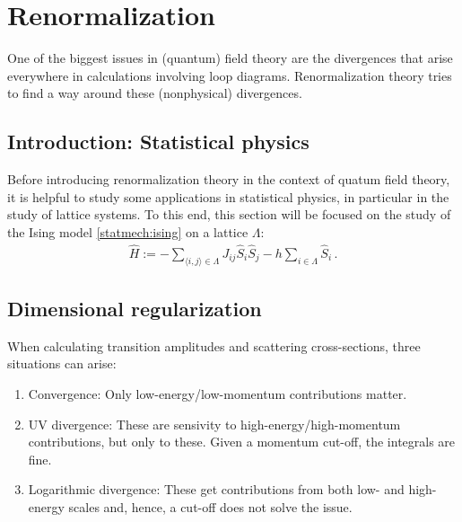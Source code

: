 \section{Renormalization}

    One of the biggest issues in (quantum) field theory are the divergences that arise everywhere in calculations involving loop diagrams. Renormalization theory tries to find a way around these (nonphysical) divergences.

\subsection{Introduction: Statistical physics}

    Before introducing renormalization theory in the context of quatum field theory, it is helpful to study some applications in statistical physics, in particular in the study of lattice systems. To this end, this section will be focused on the study of the Ising model \ref{statmech:ising} on a lattice $\Lambda$:
    \begin{gather}
        \widehat{H} := -\sum_{\langle i,j \rangle\in\Lambda}J_{ij}\widehat{S}_i\widehat{S}_j-h\sum_{i\in\Lambda}\widehat{S}_i\,.
    \end{gather}

\subsection{Dimensional regularization}

    When calculating transition amplitudes and scattering cross-sections, three situations can arise:
    \begin{enumerate}
        \item Convergence: Only low-energy/low-momentum contributions matter.
        \item UV divergence: These are sensivity to high-energy/high-momentum contributions, but only to these. Given a momentum cut-off, the integrals are fine.
        \item Logarithmic divergence: These get contributions from both low- and high-energy scales and, hence, a cut-off does not solve the issue.
    \end{enumerate}

